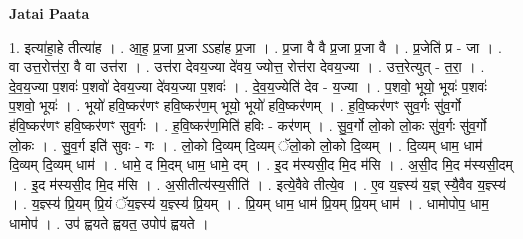 \documentclass[17pt]{extarticle}
\begin{document}
\textbf{Jatai Paata} \newline

1. इत्या॑हा॒हे तीत्या॑ह । . आ॒ह॒ प्र॒जा प्र॒जा ऽऽहा॑ह प्र॒जा । . प्र॒जा वै वै प्र॒जा प्र॒जा वै । . प्र॒जेति॑ प्र - जा । . वा उत्त॒रोत्त॑रा॒ वै वा उत्त॑रा । . उत्त॑रा देवय॒ज्या दे॑वय॒ ज्योत्त॒ रोत्त॑रा देवय॒ज्या । . उत्त॒रेत्युत् - त॒रा॒ । . दे॒व॒य॒ज्या प॒शवः॑ प॒शवो॑ देवय॒ज्या दे॑वय॒ज्या प॒शवः॑ । . दे॒व॒य॒ज्येति॑ देव - य॒ज्या । . प॒शवो॒ भूयो॒ भूयः॑ प॒शवः॑ प॒शवो॒ भूयः॑ । . भूयो॑ हवि॒ष्कर॑णꣳ हवि॒ष्कर॑ण॒म् भूयो॒ भूयो॑ हवि॒ष्कर॑णम् । . ह॒वि॒ष्कर॑णꣳ सुव॒र्गः सु॑व॒र्गो ह॑वि॒ष्कर॑णꣳ हवि॒ष्कर॑णꣳ सुव॒र्गः । . ह॒वि॒ष्कर॑ण॒मिति॑ हविः - कर॑णम् । . सु॒व॒र्गो लो॒को लो॒कः सु॑व॒र्गः सु॑व॒र्गो लो॒कः । . सु॒व॒र्ग इति॑ सुवः - गः । . लो॒को दि॒व्यम् दि॒व्यम् ॅलो॒को लो॒को दि॒व्यम् । . दि॒व्यम् धाम॒ धाम॑ दि॒व्यम् दि॒व्यम् धाम॑ । . धामे॒ द मि॒दम् धाम॒ धामे॒ दम् । . इ॒द म॑स्यसी॒द मि॒द म॑सि । . अ॒सी॒द मि॒द म॑स्यसी॒दम् । . इ॒द म॑स्यसी॒द मि॒द म॑सि । . अ॒सीतीत्य॑स्य॒सीति॑ । . इत्ये॒वैवे तीत्ये॒व । . ए॒व य॒ज्ञ्स्य॑ य॒ज्ञ् स्यै॒वैव य॒ज्ञ्स्य॑ । . य॒ज्ञ्स्य॑ प्रि॒यम् प्रि॒यं ॅय॒ज्ञ्स्य॑ य॒ज्ञ्स्य॑ प्रि॒यम् । . प्रि॒यम् धाम॒ धाम॑ प्रि॒यम् प्रि॒यम् धाम॑ । . धामोपोप॒ धाम॒ धामोप॑ । . उप॑ ह्वयते ह्वयत॒ उपोप॑ ह्वयते । \newline
\end{document}
